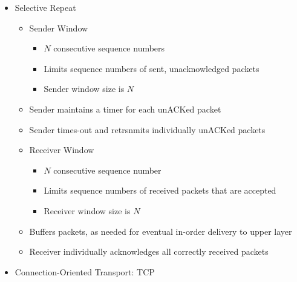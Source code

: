 \begin{itemize}
\begin{itemize}
\begin{itemize}
        \end{itemize}

    \end{itemize}

  \item Selective Repeat

    \begin{itemize}

      \item Sender Window

        \begin{itemize}

          \item $N$ consecutive sequence numbers

          \item Limits sequence numbers of sent, unacknowledged packets

          \item Sender window size is $N$

        \end{itemize}

      \item Sender maintains a timer for each unACKed packet

      \item Sender times-out and retrsnmits individually unACKed packets

      \item Receiver Window

        \begin{itemize}

          \item $N$ consecutive sequence number

          \item Limits sequence numbers of received packets that are accepted

          \item Receiver window size is $N$

        \end{itemize}

      \item Buffers packets, as needed for eventual in-order delivery to upper layer

      \item Receiver individually acknowledges all correctly received packets

    \end{itemize}

  \item Connection-Oriented Transport: TCP


\end{itemize}
